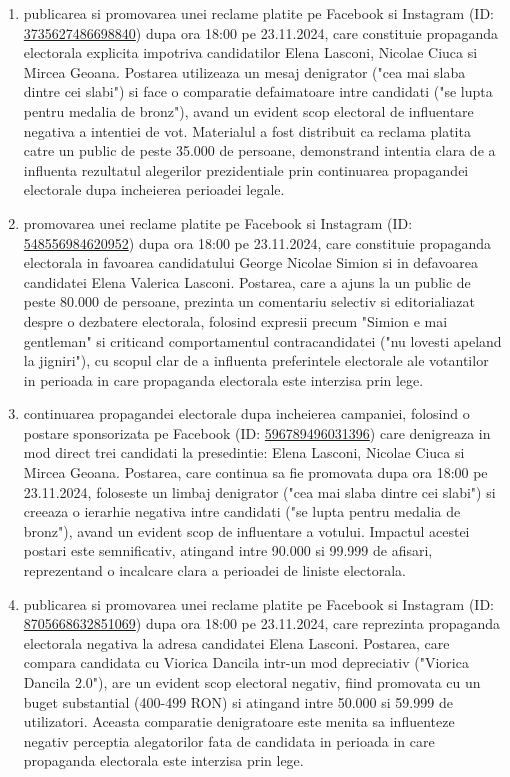 \documentclass[a4paper,12pt]{article}
\begin{document}
\begin{enumerate}[leftmargin=*, label=\arabic*.)]
    \item publicarea si promovarea unei reclame platite pe Facebook si Instagram (ID: \href{https://www.facebook.com/ads/library/?id=3735627486698840}{3735627486698840}) dupa ora 18:00 pe 23.11.2024, care constituie propaganda electorala explicita impotriva candidatilor Elena Lasconi, Nicolae Ciuca si Mircea Geoana. Postarea utilizeaza un mesaj denigrator ("cea mai slaba dintre cei slabi") si face o comparatie defaimatoare intre candidati ("se lupta pentru medalia de bronz"), avand un evident scop electoral de influentare negativa a intentiei de vot. Materialul a fost distribuit ca reclama platita catre un public de peste 35.000 de persoane, demonstrand intentia clara de a influenta rezultatul alegerilor prezidentiale prin continuarea propagandei electorale dupa incheierea perioadei legale.
    \item promovarea unei reclame platite pe Facebook si Instagram (ID: \href{https://www.facebook.com/ads/library/?id=548556984620952}{548556984620952}) dupa ora 18:00 pe 23.11.2024, care constituie propaganda electorala in favoarea candidatului George Nicolae Simion si in defavoarea candidatei Elena Valerica Lasconi. Postarea, care a ajuns la un public de peste 80.000 de persoane, prezinta un comentariu selectiv si editorialiazat despre o dezbatere electorala, folosind expresii precum "Simion e mai gentleman" si criticand comportamentul contracandidatei ("nu lovesti apeland la jigniri"), cu scopul clar de a influenta preferintele electorale ale votantilor in perioada in care propaganda electorala este interzisa prin lege.
    \item continuarea propagandei electorale dupa incheierea campaniei, folosind o postare sponsorizata pe Facebook (ID: \href{https://www.facebook.com/ads/library/?id=596789496031396}{596789496031396}) care denigreaza in mod direct trei candidati la presedintie: Elena Lasconi, Nicolae Ciuca si Mircea Geoana. Postarea, care continua sa fie promovata dupa ora 18:00 pe 23.11.2024, foloseste un limbaj denigrator ("cea mai slaba dintre cei slabi") si creeaza o ierarhie negativa intre candidati ("se lupta pentru medalia de bronz"), avand un evident scop de influentare a votului. Impactul acestei postari este semnificativ, atingand intre 90.000 si 99.999 de afisari, reprezentand o incalcare clara a perioadei de liniste electorala.
    \item publicarea si promovarea unei reclame platite pe Facebook si Instagram (ID: \href{https://www.facebook.com/ads/library/?id=8705668632851069}{8705668632851069}) dupa ora 18:00 pe 23.11.2024, care reprezinta propaganda electorala negativa la adresa candidatei Elena Lasconi. Postarea, care compara candidata cu Viorica Dancila intr-un mod depreciativ ("Viorica Dancila 2.0"), are un evident scop electoral negativ, fiind promovata cu un buget substantial (400-499 RON) si atingand intre 50.000 si 59.999 de utilizatori. Aceasta comparatie denigratoare este menita sa influenteze negativ perceptia alegatorilor fata de candidata in perioada in care propaganda electorala este interzisa prin lege.
\end{enumerate}
\end{document}
